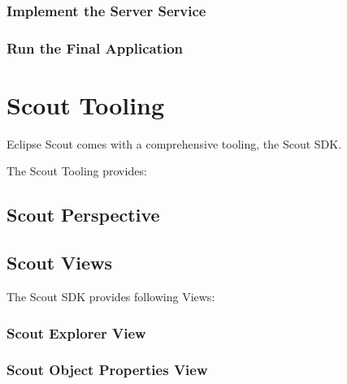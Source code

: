 \documentclass[a4paper,10pt,twoside]{book}
\begin{document}
\subsection*{Implement the Server Service}

\subsection*{Run the Final Application}


\chapter*{Scout Tooling}

Eclipse Scout comes with a comprehensive tooling, the Scout SDK.


The Scout Tooling provides:

\section*{Scout Perspective}


\section*{Scout Views}

The Scout SDK provides following Views:

\subsection*{Scout Explorer View}

\subsection*{Scout Object Properties View}

\end{document}
